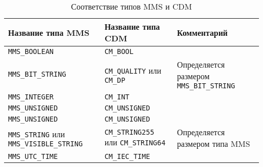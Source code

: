 \begin{table}[ht]
    \caption{Соответствие типов MMS и CDM}
    \label{table:func:MmsCdmTypes}
    \begin{tabular}{| >{\raggedright}m{}
                    | >{\raggedright}m{}
                    | >{\raggedright\arraybackslash}m{}|}
        \hline
        \centering Название типа MMS
        & \centering Название типа CDM
        & \centering\arraybackslash Комментарий \\

        \hline
        \lstinline[]$MMS_BOOLEAN$ &
        \lstinline[]$CM_BOOL$ &
        \\

        \hline
        \lstinline[]$MMS_BIT_STRING$ &
        \lstinline[]$CM_QUALITY$ или
        \lstinline[]$CM_DP$ &
        Определяется размером \lstinline[]$MMS_BIT_STRING$
        \\

        \hline
        \lstinline[]$MMS_INTEGER$ &
        \lstinline[]$CM_INT$ &
        \\

        \hline
        \lstinline[]$MMS_UNSIGNED$ &
        \lstinline[]$CM_UNSIGNED$ &
        \\

        \hline
        \lstinline[]$MMS_UNSIGNED$ &
        \lstinline[]$CM_UNSIGNED$ &
        \\

        \hline
        \lstinline[]$MMS_STRING$ или
        \lstinline[]$MMS_VISIBLE_STRING$ &
        \lstinline[]$CM_STRING255$ или
        \lstinline[]$CM_STRING64$ &
        Определяется размером типа MMS
        \\

        \hline
        \lstinline[]$MMS_UTC_TIME$ &
        \lstinline[]$CM_IEC_TIME$ &
        \\

        \hline
    \end{tabular}
\end{table}

